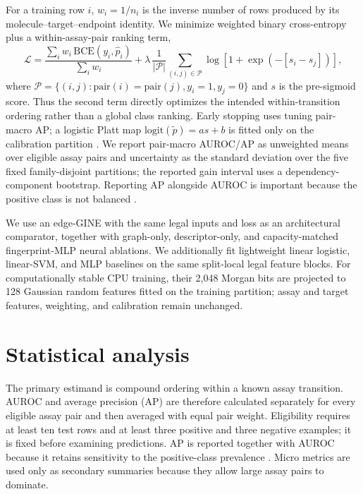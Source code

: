 \documentclass[letterpaper]{article}
\begin{document}
For a training row $i$, $w_i=1/n_i$ is the inverse number of rows produced by its molecule--target--endpoint identity. We minimize weighted binary cross-entropy plus a within-assay-pair ranking term,
\[
\mathcal L=\frac{\sum_i w_i\,\mathrm{BCE}(y_i,\hat p_i)}{\sum_iw_i}
+\lambda\,\frac{1}{|\mathcal P|}\sum_{(i,j)\in\mathcal P}
\log\!\left[1+\exp\!\left(-[s_i-s_j]\right)\right],
\]
where $\mathcal P=\{(i,j):\mathrm{pair}(i)=\mathrm{pair}(j),y_i=1,y_j=0\}$ and $s$ is the pre-sigmoid score. Thus the second term directly optimizes the intended within-transition ordering rather than a global class ranking. Early stopping uses tuning pair-macro AP; a logistic Platt map $\mathrm{logit}(\tilde p)=a s+b$ is fitted only on the calibration partition \citep{platt1999probabilistic}. We report pair-macro AUROC/AP as unweighted means over eligible assay pairs and uncertainty as the standard deviation over the five fixed family-disjoint partitions; the reported gain interval uses a dependency-component bootstrap. Reporting AP alongside AUROC is important because the positive class is not balanced \citep{davis2006pr,saito2015pr}.

We use an edge-GINE with the same legal inputs and loss as an architectural comparator, together with graph-only, descriptor-only, and capacity-matched fingerprint-MLP neural ablations. We additionally fit lightweight linear logistic, linear-SVM, and MLP baselines on the same split-local legal feature blocks. For computationally stable CPU training, their 2,048 Morgan bits are projected to 128 Gaussian random features fitted on the training partition; assay and target features, weighting, and calibration remain unchanged.

\section{Statistical analysis}

The primary estimand is compound ordering within a known assay transition. AUROC and average precision (AP) are therefore calculated separately for every eligible assay pair and then averaged with equal pair weight. Eligibility requires at least ten test rows and at least three positive and three negative examples; it is fixed before examining predictions. AP is reported together with AUROC because it retains sensitivity to the positive-class prevalence \citep{davis2006pr,saito2015pr}. Micro metrics are used only as secondary summaries because they allow large assay pairs to dominate.
\end{document}
